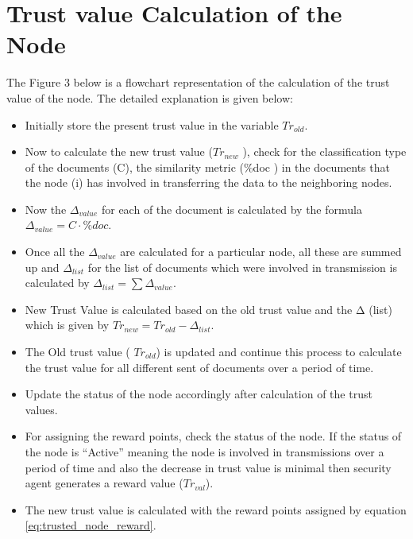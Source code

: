  \section{Trust value Calculation of the Node}
The Figure 3 below is a flowchart representation of the calculation of the trust value of the node. The detailed explanation is given below:
\begin{itemize}
    \item Initially store the present trust value in the variable \( Tr_{old} \).
    \item Now to calculate the new trust value (\( Tr_{new} \) ), check for the
    classification type of the documents (C), the similarity metric (\%doc ) in
    the documents that the node (i) has involved in transferring the data to the
    neighboring nodes.  
    \item Now the \( \Delta_{value} \) for each of the document is calculated
    by the formula  \( \Delta_{value} = C \cdot \% doc \).
    \item Once all the \( \Delta_{value} \) are calculated for a particular node, all these are
    summed up and      \( \Delta_{list} \) for the list of documents which were involved in
    transmission is calculated by \( \Delta_{list} = \sum \Delta_{value} \).  
    \item New Trust Value is calculated based on the old trust value and the Δ (list)
        which is given by \( Tr_{new} = Tr_{old} - \Delta_{list} \).
    \item The Old trust value ( \(Tr_{old} \)) is updated and continue this process to
    calculate the trust value for all different sent of documents over a period
    of time.  
    \item Update the status of the node accordingly after calculation of the
    trust values.
    \item For assigning the reward points, check the status of the node. If the status
    of the node is “Active” meaning the node is involved in transmissions over
    a period of time and also the decrease in trust value is minimal then
    security agent generates a reward value      (\( Tr_{val} \)).  
    \item The new trust value is calculated with the reward points assigned by
        equation \ref{eq:trusted_node_reward}.
\end{itemize}
